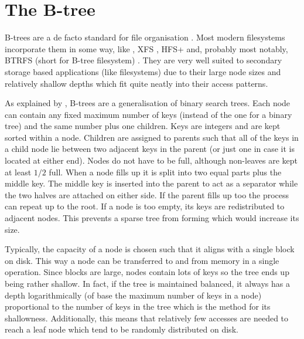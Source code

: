     \section{The B-tree}
        \label{sec:btree}

        B-trees are a de facto standard for file organisation
        \cite{btree_ubiquitous}. Most modern filesystems incorporate them in
        some way, like , XFS
        \cite{XFS_scalability}, HFS+ \cite{HFSplus} and, probably most notably,
        BTRFS (short for B-tree filesystem) \cite{BTRFS}. They are very well
        suited to secondary storage based applications (like filesystems) due to
        their large node sizes and relatively shallow depths which fit quite
        neatly into their access patterns.

        As explained by , B-trees are a
        generalisation of binary search trees. Each node can contain any fixed
        maximum number of keys (instead of the one for a binary tree) and the
        same number plus one children. Keys are integers and are kept sorted
        within a node. Children are assigned to parents such that all of the
        keys in a child node lie between two adjacent keys in the parent (or
        just one in case it is located at either end). Nodes do not have to be
        full, although non-leaves are kept at least $1/2$ full. When a node
        fills up it is split into two equal parts plus the middle key. The
        middle key is inserted into the parent to act as a separator while the
        two halves are attached on either side. If the parent fills up too the
        process can repeat up to the root. If a node is too empty, its keys are
        redistributed to adjacent nodes. This prevents a sparse tree from
        forming which would increase its size.

        Typically, the capacity of a node is chosen such that it aligns with a
        single block on disk. This way a node can be transferred to and from
        memory in a single operation. Since blocks are large, nodes contain
        lots of keys so the tree ends up being rather shallow. In fact, if the
        tree is maintained balanced, it always has a depth logarithmically (of
        base the maximum number of keys in a node) proportional to the number
        of keys in the tree which is the method for its shallowness. Additionally,
        this means that relatively few accesses are needed to reach a leaf node
        which tend to be randomly distributed on disk.

